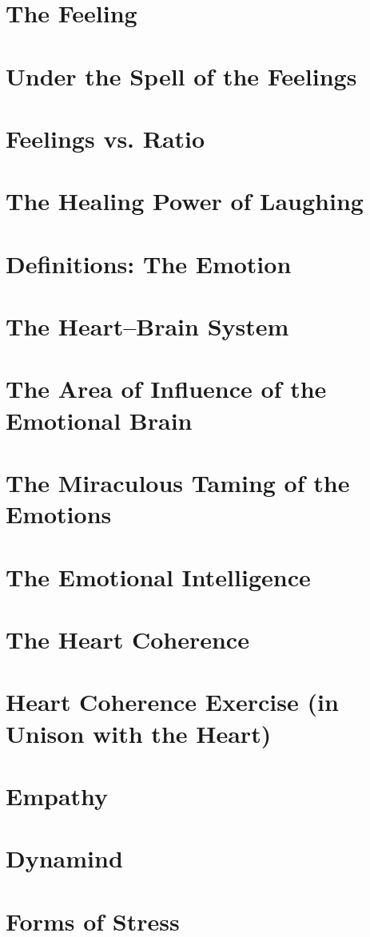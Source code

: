 \documentclass[../main.tex]{subfiles}
\begin{document}
\chapter{The Feeling}


\chapter{Under the Spell of the Feelings}


\chapter{Feelings vs.  Ratio}


\chapter{The Healing Power of Laughing}


\chapter{Definitions: The Emotion}


\chapter{The Heart--Brain System}


\chapter[Influence of the Emotional Brain]{The Area of Influence of the Emotional Brain}


\chapter{The Miraculous Taming of the Emotions}


\chapter{The Emotional Intelligence}


\chapter{The Heart Coherence}


\chapter[Heart Coherence Exercise]{Heart Coherence Exercise (in Unison with the Heart)}


\chapter{Empathy}


\chapter{Dynamind}


\chapter{Forms of Stress}

\end{document}
